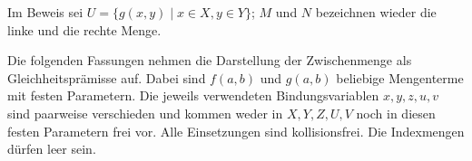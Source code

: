 Im Beweis sei \(U=\{g(x,y)\mid x\in X,y\in Y\}\);
\(M\) und \(N\) bezeichnen wieder die linke und die rechte Menge.
\begin{tabproofwide}
\end{tabproofwide}

Die folgenden Fassungen nehmen die Darstellung der Zwischenmenge als
Gleichheitsprämisse auf. Dabei sind \(f(a,b)\) und \(g(a,b)\) beliebige
Mengenterme mit festen Parametern. Die jeweils verwendeten
Bindungsvariablen \(x,y,z,u,v\) sind paarweise verschieden und kommen
weder in \(X,Y,Z,U,V\) noch in diesen festen Parametern frei vor.
Alle Einsetzungen sind kollisionsfrei. Die Indexmengen dürfen leer sein.

